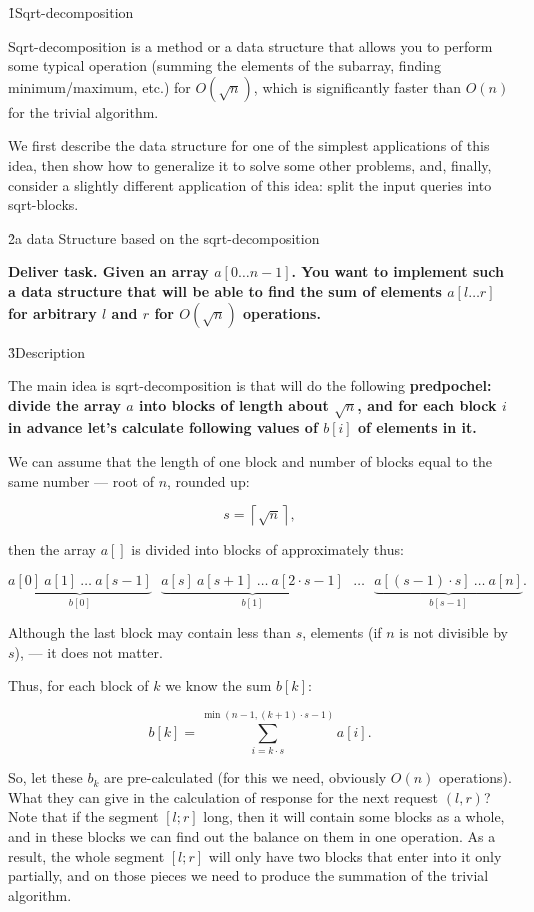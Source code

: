 \h1{Sqrt-decomposition}

Sqrt-decomposition is a method or a data structure that allows you to perform some typical operation (summing the elements of the subarray, finding minimum/maximum, etc.) for $O(\sqrt{n})$, which is significantly faster than $O(n)$ for the trivial algorithm.

We first describe the data structure for one of the simplest applications of this idea, then show how to generalize it to solve some other problems, and, finally, consider a slightly different application of this idea: split the input queries into sqrt-blocks.


\h2{a data Structure based on the sqrt-decomposition}

\bf{Deliver task}. Given an array $a[0 \ldots n-1]$. You want to implement such a data structure that will be able to find the sum of elements $a[l \ldots r]$ for arbitrary $l$ and $r$ for $O(\sqrt{n})$ operations.


\h3{Description}

The main idea is sqrt-decomposition is that will do the following \bf{predpochel}: divide the array $a$ into blocks of length about $\sqrt{n}$, and for each block $i$ in advance let's calculate following values of $b[i]$ of elements in it.

We can assume that the length of one block and number of blocks equal to the same number --- root of $n$, rounded up:

$$ s = \left\lceil \sqrt{n} \right\rceil, $$

then the array $a[]$ is divided into blocks of approximately thus:

$$ \underbrace{ a[0] ~ a[1] ~ \ldots ~ a[s-1] }_{b[0]} ~~~ \underbrace{ a[s] ~ a[s+1] ~ \ldots ~ a[2 \cdot s-1] }_{b[1]} ~~~ \ldots ~~~ \underbrace{ a[(s-1) \cdot s] ~ \ldots ~ a[n] }_{b[s-1]}. $$

Although the last block may contain less than $s$, elements (if $n$ is not divisible by $s$), --- it does not matter.

Thus, for each block of $k$ we know the sum $b[k]$:

$$ b[k] = \sum_{i=k \cdot s}^{\min (n-1, (k+1) \cdot s - 1)} a[i]. $$

So, let these $b_k$ are pre-calculated (for this we need, obviously $O(n)$ operations). What they can give in the calculation of response for the next request $(l,r)$? Note that if the segment $[l;r]$ long, then it will contain some blocks as a whole, and in these blocks we can find out the balance on them in one operation. As a result, the whole segment $[l;r]$ will only have two blocks that enter into it only partially, and on those pieces we need to produce the summation of the trivial algorithm.

